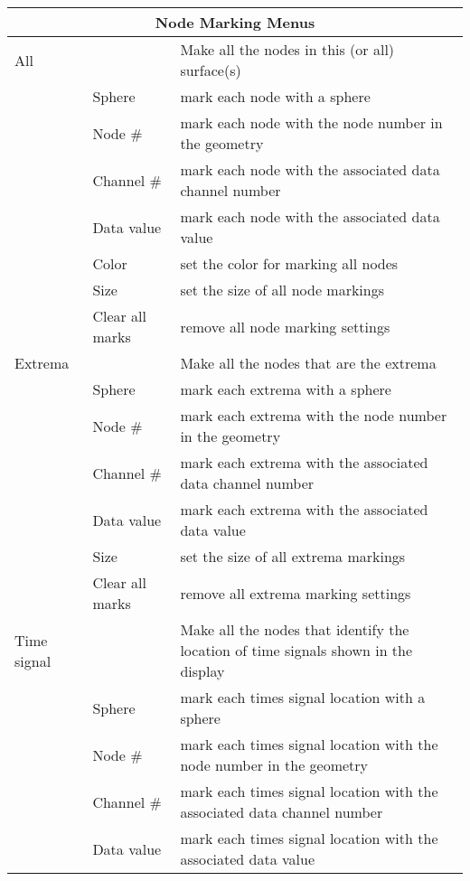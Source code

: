 \begin{table}[ht]
  \begin{center}
    \begin{tabular}{|l|l|p{3 in}|} \hline
      \multicolumn{3}{|c|}{Node Marking Menus} \\ \hline
    All & & Make all the nodes in this (or all) surface(s) \\
    &  Sphere & mark each node with a sphere \\
    &  Node \# & mark each node with the node number in the geometry \\
    &  Channel \# & mark each node with the associated data channel number \\
    &  Data value & mark each node with the associated data value \\
    &  Color & set the color for marking all nodes \\
    &  Size & set the size of all node markings \\
    &  Clear all marks & remove all node marking settings \\ 
    \hline
    Extrema & & Make all the nodes that are the extrema  \\
    &  Sphere & mark each extrema with a sphere \\
    &  Node \# & mark each extrema with the node number in the geometry \\
    &  Channel \# & mark each extrema with the associated data channel
    number \\ 
    &  Data value & mark each extrema with the associated data value \\
    &  Size & set the size of all extrema markings \\
    &  Clear all marks & remove all extrema marking settings \\ 
    \hline
    Time signal & & Make all the nodes that identify the location of time
    signals shown in the display  \\
    &  Sphere & mark each times signal location with a sphere \\
    &  Node \# & mark each times signal location with the node number in
    the geometry \\ 
    &  Channel \# & mark each times signal location with the associated
    data channel number \\ 
    &  Data value & mark each times signal location with the associated
    data value \\ 

\end{tabular}
\end{center}
\end{table}
